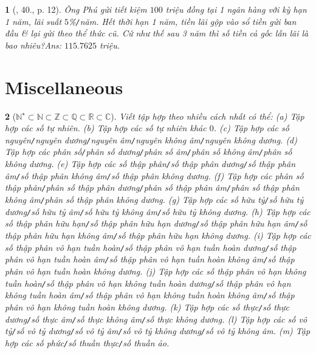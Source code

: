 \documentclass{article}
\newtheorem{baitoan}{}
\begin{document}
\begin{baitoan}[\cite{Tuyen_Toan_7}, 40., p. 12]
	Ông Phú gửi tiết kiệm $100$ triệu đồng tại 1 ngân hàng với kỳ hạn 1 năm, lãi suất $5$\%\emph{\texttt{/}}năm. Hết thời hạn 1 năm, tiền lãi gộp vào sổ tiền gửi ban đầu \& lại gửi theo thể thức cũ. Cứ như thế sau 3 năm thì số tiền cả gốc lẫn lãi là bao nhiêu?\hfill{\sf Ans: $115.7625$ triệu.}
\end{baitoan}


\section{Miscellaneous}

\begin{baitoan}[$\mathbb{N}^\star\subset\mathbb{N}\subset\mathbb{Z}\subset\mathbb{Q}\subset\mathbb{R}\subset\mathbb{C}$]
	Viết tập hợp theo nhiều cách nhất có thể: (a) Tập hợp các số tự nhiên. (b) Tập hợp các số tự nhiên khác $0$. (c) Tập hợp các số nguyên{\tt/}nguyên dương{\tt/}nguyên âm{\tt/}nguyên không âm{\tt/}nguyên không dương. (d) Tập hợp các phân số{\tt/}phân số dương{\tt/}phân số âm{\tt/}phân số không âm{\tt/}phân số không dương. (e) Tập hợp các số thập phân{\tt/}số thập phân dương{\tt/}số thập phân âm{\tt/}số thập phân không âm{\tt/}số thập phân không dương. (f) Tập hợp các phân số thập phân{\tt/}phân số thập phân dương{\tt/}phân số thập phân âm{\tt/}phân số thập phân không âm{\tt/}phân số thập phân không dương. (g) Tập hợp các số hữu tỷ{\tt/}số hữu tỷ dương{\tt/}số hữu tỷ âm{\tt/}số hữu tỷ không âm{\tt/}số hữu tỷ không dương. (h) Tập hợp các số thập phân hữu hạn{\tt/}số thập phân hữu hạn dương{\tt/}số thập phân hữu hạn âm{\tt/}số thập phân hữu hạn không âm{\tt/}số thập phân hữu hạn không dương. (i) Tập hợp các số thập phân vô hạn tuần hoàn{\tt/}số thập phân vô hạn tuần hoàn dương{\tt/}số thập phân vô hạn tuần hoàn âm{\tt/}số thập phân vô hạn tuần hoàn không âm{\tt/}số thập phân vô hạn tuần hoàn không dương. (j) Tập hợp các số thập phân vô hạn không tuần hoàn{\tt/}số thập phân vô hạn không tuần hoàn dương{\tt/}số thập phân vô hạn không tuần hoàn âm{\tt/}số thập phân vô hạn không tuần hoàn không âm{\tt/}số thập phân vô hạn không tuần hoàn không dương.  (k) Tập hợp các số thực{\tt/}số thực dương{\tt/}số thực âm{\tt/}số thực không âm{\tt/}số thực không dương. (l) Tập hợp các số vô tỷ{\tt/}số vô tỷ dương{\tt/}số vô tỷ âm{\tt/}số vô tỷ không dương{\tt/}số vô tỷ không âm. (m) Tập hợp các số phức{\tt/}số thuần thực{\tt/}số thuần ảo.
\end{baitoan}


\printbibliography[heading=bibintoc]
\end{document}
